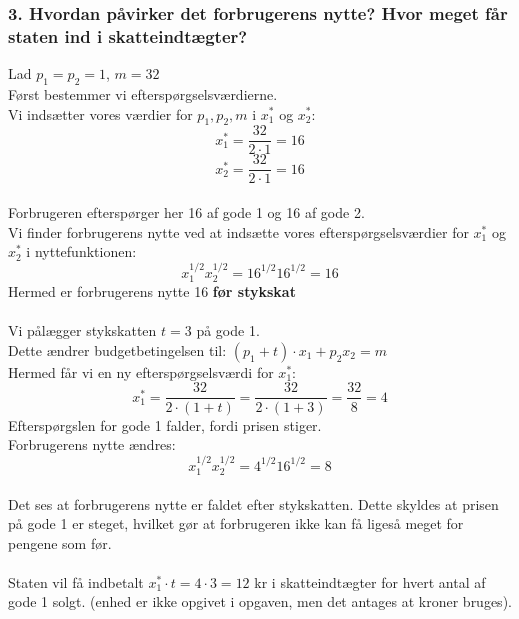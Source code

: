 \documentclass[a4paper, 12pt]{article}
\begin{document}
\subsubsection*{3. Hvordan påvirker det forbrugerens nytte? Hvor meget får staten ind i skatteindtægter?}
Lad $p_{1}=p_{2}=1$, $m=32$\\
Først bestemmer vi efterspørgselsværdierne.\\
Vi indsætter vores værdier for $p_{1},p_{2}, m$ i $x_{1}^{*}$ og $x_{2}^{*}$:
$$x_{1}^{*} = \dfrac{32}{2\cdot 1} = 16$$
$$x_{2}^{*} = \dfrac{32}{2\cdot 1} = 16$$\\
Forbrugeren efterspørger her 16 af gode 1 og 16 af gode 2.
\\
Vi finder forbrugerens nytte ved at indsætte vores efterspørgselsværdier for $x_{1}^{*}$ og $x_{2}^{*}$ i nyttefunktionen:
$$x_{1}^{1/2}x_{2}^{1/2} = 16^{1/2}16^{1/2} = 16$$
Hermed er forbrugerens nytte 16 \textbf{før stykskat}
\\\\
Vi pålægger stykskatten $t=3$ på gode 1.\\
Dette ændrer budgetbetingelsen til: $(p_{1}+t)\cdot x_{1} + p_{2}x_{2} =m$\\
Hermed får vi en ny efterspørgselsværdi for $x_{1}^{*}$:
$$x_{1}^{*} = \dfrac{32}{2\cdot (1+t)} = \dfrac{32}{2\cdot (1+3)}= \dfrac{32}{8} = 4$$
Efterspørgslen for gode 1 falder, fordi prisen stiger.\\
Forbrugerens nytte ændres:
$$x_{1}^{1/2}x_{2}^{1/2} = 4^{1/2}16^{1/2} = 8$$
\\
Det ses at forbrugerens nytte er faldet efter stykskatten. Dette skyldes at prisen på gode 1 er steget, hvilket gør at forbrugeren ikke kan få ligeså meget for pengene som før.\\\\
Staten vil få indbetalt $x_{1}^{*} \cdot t = 4 \cdot 3 = 12$ kr i skatteindtægter for hvert antal af gode 1 solgt. (enhed er ikke opgivet i opgaven, men det antages at kroner bruges).
\end{document}
